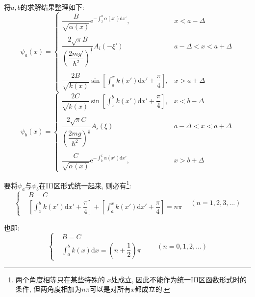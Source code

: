 \documentclass[a4paper, 11pt]{article}
\begin{document}
\begin{spacing}{1.2}
          将$a, b$的求解结果整理如下:
          \begin{equation}
            \psi_a(x) = \left\{\begin{array}{ll}
              \dfrac{B}{\sqrt{\alpha(x)}}\mathrm{e}^{-\int_x^a\alpha(x')\mathrm{d}x'}, & x<a-\Delta\\
              \\
              \dfrac{2\sqrt{\pi}B}{\left(\dfrac{2mg'}{\hbar^2}\right)^{\frac{1}{6}}}A_i(-\xi') & a-\Delta<x<a+\Delta\\
              \\
              \dfrac{2B}{\sqrt{k(x)}}\sin\left[\int_a^xk(x')\mathrm{d}x'+\dfrac{\pi}{4}\right], &  x>a+\Delta            
            \end{array}\right.
          \end{equation}
          \begin{equation}
            \psi_b(x) = \left\{\begin{array}{ll}
              \dfrac{2C}{\sqrt{k(x)}}\sin\left[\int_x^bk(x')\mathrm{d}x'+\dfrac{\pi}{4}\right], & x<b-\Delta\\
              \\
              \dfrac{2\sqrt{\pi}C}{\left(\dfrac{2mg}{\hbar^2}\right)^{\frac{1}{6}}}A_i(\xi) & a-\Delta<x<a+\Delta\\ 
              \\
              \dfrac{C}{\sqrt{\alpha(x)}}\mathrm{e}^{-\int_b^x\alpha(x')\mathrm{d}x'}, & x>b+\Delta              
            \end{array}\right.
          \end{equation}
   
          要将$\psi_a$与$\psi_b$在III区形式统一起来, 则必有\footnote{两个角度相等只在某些特殊的
          $x$处成立, 因此不能作为统一III区函数形式时的条件, 但两角度相加为$n\pi$可以是对所有$x$都成立的.}:
          \begin{equation}
            \left\{
            \begin{aligned}
              &B = C\\
              &\left[\int_x^bk(x')\mathrm{d}x'+\dfrac{\pi}{4}\right]+%
               \left[\int_a^xk(x')\mathrm{d}x'+\dfrac{\pi}{4}\right]= n\pi
            \end{aligned}\right.\;\;\;(n=1,2,3,\ldots)
          \end{equation}

          也即:
          \begin{equation}
            \label{WKB:wuchuizhibi}
            \left\{
            \begin{aligned}
              &B = C\\
              &\int_a^bk(x)\mathrm{d}x= \left(n+\dfrac{1}{2}\right)\pi
            \end{aligned}\right. \;\;\;\;\;\;\;(n=0,1,2,\ldots)
          \end{equation}


\end{spacing}
\end{document}
